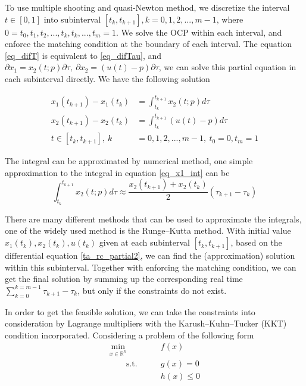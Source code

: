 \documentclass  [
  paper    = a4,
  BCOR     = 10mm,
  twoside,
  fontsize = 12pt,
  fleqn,
  toc      = bibnumbered,
  toc      = listofnumbered,
  numbers  = noendperiod,
  headings = normal,
  listof   = leveldown,
  version  = 3.03
]                                       {scrreprt}
\newcommand{\<}{\langle}
\renewcommand{\>}{\rangle}
\begin{document}
   To use multiple shooting and quasi-Newton method, we discretize the interval $t\in [0,1]$ into subinterval $[t_{k}, t_{k+1}], k = 0, 1, 2, ..., m-1$, where $0 = t_0, t_1, t_2, ...,t_k, t_k, ..., t_m = 1$. We solve the OCP within each interval, and enforce the matching condition at the boundary of each interval. 
   The equation \ref{eq_difT} is equivalent to \ref{eq_difTau}, and $\partial x_1= x_2(t;p) \partial \tau, \ \partial x_2 = ( u(t)-p) \partial \tau$, we can solve this partial equation in each subinterval directly. We have the following solution
   
   \begin{subequations}
	\begin{align}
      x_1(t_{k+1}) -  x_1(t_k)  &= \int_{t_k}^{t_{k+1}} x_2(t;p) d \tau \label{eq_x1_int} \\
      x_2(t_{k+1}) -  x_2(t_k)  &= \int_{t_k}^{t_{k+1}} (u(t)-p) d \tau \\
      t \in [t_{k}, t_{k+1}], \  k &= 0, 1, 2, ..., m-1, \  t_0 =0, t_m =1
   	\end{align}
\end{subequations}

The integral can be approximated by numerical method, one simple approximation to the integral in equation \ref{eq_x1_int} can be 
\begin{equation}
\int_{t_k}^{t_{k+1}} x_2(t;p) d \tau  \approx \frac{x_2(t_{k+1}) + x_2(t_k)}{2} (\tau_{k+1} -\tau_k)
\end{equation}

There are many different methods that can be used to approximate the integrals, one of the widely used method is the Runge–Kutta method. With initial value $x_1(t_k),x_2(t_k), u(t_k)$ given at each subinterval $[t_{k}, t_{k+1}]$, based on the differential equation \ref{ta_rc_partial2}, we can find the (approximation) solution within this subinterval. Together with enforcing the matching condition, we can get the final solution by summing up the corresponding real time $\sum_{k=0}^{k=m-1} \tau_{k+1} - \tau_k$, but only if the constraints do not exist. 


In order to get the feasible solution, we can take the constraints into consideration by Lagrange multipliers with the Karush–Kuhn–Tucker (KKT) condition incorporated. Considering a problem of the following form
\begin{equation}
	\label{eq:OCP_discret_compact}
	\begin{aligned}
		\underset{x \in \mathbb{R}^n}{\text{min}} \qquad &f(x)	\\
		\qquad \text{s.t.}\qquad	&  g(x)	 = 0   \\
						                  &  h(x)	\leq 0 
	\end{aligned}
\end{equation}
\end{document}
